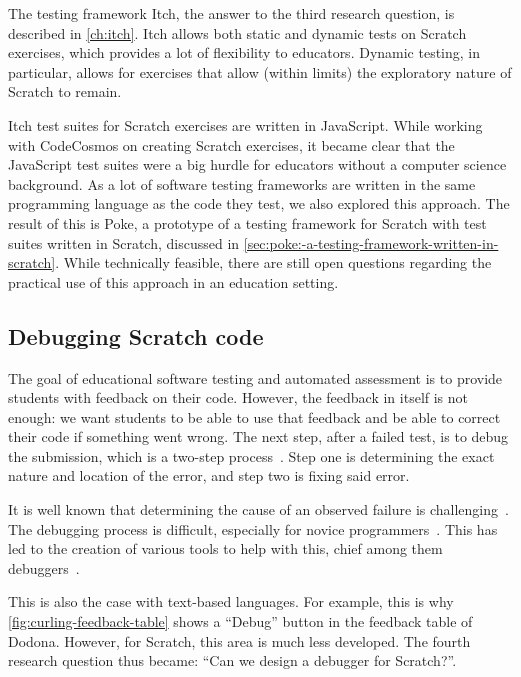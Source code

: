 \documentclass[../main]{subfiles}
\begin{document}
The testing framework Itch, the answer to the third research question, is described in \cref{ch:itch}.
Itch allows both static and dynamic tests on Scratch exercises, which provides a lot of flexibility to educators.
Dynamic testing, in particular, allows for exercises that allow (within limits) the exploratory nature of Scratch to remain.

Itch test suites for Scratch exercises are written in JavaScript.
While working with CodeCosmos on creating Scratch exercises, it became clear that the JavaScript test suites were a big hurdle for educators without a computer science background.
As a lot of software testing frameworks are written in the same programming language as the code they test, we also explored this approach.
The result of this is Poke, a prototype of a testing framework for Scratch with test suites written in Scratch, discussed in \cref{sec:poke:-a-testing-framework-written-in-scratch}.
While technically feasible, there are still open questions regarding the practical use of this approach in an education setting.

\subsection{Debugging Scratch code}\label{subsec:debugging-scratch-code}

The goal of educational software testing and automated assessment is to provide students with feedback on their code.
However, the feedback in itself is not enough: we want students to be able to use that feedback and be able to correct their code if something went wrong.
The next step, after a failed test, is to debug the submission, which is a two-step process~\autocite{myersArtSoftwareTesting2012}.
Step one is determining the exact nature and location of the error, and step two is fixing said error.

It is well known that determining the cause of an observed failure is challenging~\autocite{ammannIntroductionSoftwareTesting2016}.
The debugging process is difficult, especially for novice programmers~\autocite{mccauleyDebuggingReviewLiterature2008}.
This has led to the creation of various tools to help with this, chief among them debuggers~\autocite{rosenbergHowDebuggersWork1996}.

This is also the case with text-based languages.
For example, this is why \cref{fig:curling-feedback-table} shows a ``Debug'' button in the feedback table of Dodona.
However, for Scratch, this area is much less developed.
The fourth research question  thus became: ``Can we design a debugger for Scratch?''.
\end{document}
